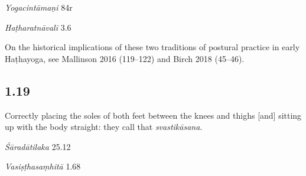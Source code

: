 \begin{ekdosis}
\begin{testimonia}[hp01_018]
\emph{Yogacintāmaṇi} 84r

\begin{versinnote}
\end{versinnote}

\emph{Haṭharatnāvalī} 3.6

\begin{versinnote}
\end{versinnote}

\end{testimonia}

\begin{philcomm}[hp01_018]        
On the historical implications of these two traditions of postural practice in early Haṭhayoga, see Mallinson 2016 (119–122) and Birch 2018 (45–46).
\end{philcomm}

\subsection*{1.19}
\begin{translation}[hp01_019]
Correctly placing the soles of both feet between the knees and thighs [and] sitting up with the body straight: they call that \emph{svastikāsana}.
\end{translation}

\begin{sources}[hp01_019]
\emph{Śāradātilaka} 25.12

\begin{versinnote}
\end{versinnote}

\emph{Vasiṣṭhasaṃhitā} 1.68

\begin{versinnote}
\end{versinnote}


\end{sources}
\end{ekdosis}
